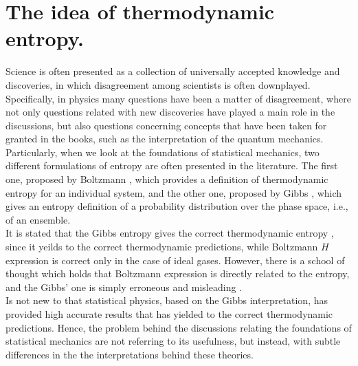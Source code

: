 \section{The idea of thermodynamic entropy.}
Science is often presented as a collection of universally accepted knowledge and discoveries, in which disagreement among scientists is often downplayed.
Specifically, in physics many questions have been a matter of disagreement, where not only questions related with new discoveries have played a main role in the discussions, but also questions concerning concepts that have been taken for granted in the books, such as the interpretation of the quantum mechanics. Particularly, when we look at the foundations of statistical mechanics, two different formulations of entropy are often presented in the literature. The first one, proposed by Boltzmann \cite{boltzmann1871prioritat}, which provides a definition of thermodynamic entropy for an individual system, and the other one, proposed by Gibbs \cite{gibbs_elementary_1902}, which gives an entropy definition of a probability distribution over the phase space, i.e., of an ensemble.\\
\indent It is stated that the Gibbs entropy gives the correct thermodynamic entropy \cite{lr_statistical_1963}, since it yeilds to the correct thermodynamic predictions, while Boltzmann $H$ expression is correct only in the case of ideal gases. However, there is a school of thought which holds that Boltzmann expression is directly related to the entropy, and the Gibbs' one is simply erroneous and misleading \cite{ehrenfest_conceptual_1959}.\\
\indent Is not new to that statistical physics, based on the Gibbs interpretation, has provided high accurate results that has yielded to the correct thermodynamic predictions. Hence, the problem behind the discussions relating the foundations of statistical mechanics are not referring to its usefulness, but instead, with subtle differences in the the interpretations behind these theories.
